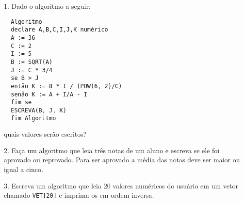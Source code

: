 \documentclass[10pt]{article}
\begin{document}
1. Dado o algoritmo a seguir:

\begin{lstlisting}
  Algoritmo
  declare A,B,C,I,J,K numérico
  A := 36
  C := 2
  I := 5
  B := SQRT(A)
  J := C * 3/4
  se B > J
  então K := 8 * I / (POW(6, 2)/C)
  senão K := A + I/A - I
  fim se
  ESCREVA(B, J, K)
  fim Algoritmo
\end{lstlisting}

\noindent quais valores serão escritos?

2. Faça um algoritmo que leia três notas de um aluno e
escreva se ele foi aprovado ou reprovado. Para ser aprovado a média
das notas deve ser maior ou igual a cinco.

3. Escreva um algoritmo que leia $20$ valores numéricos do
usuário em um vetor chamado {\tt VET[20]} e imprima-os em ordem
inversa.
\end{document}
